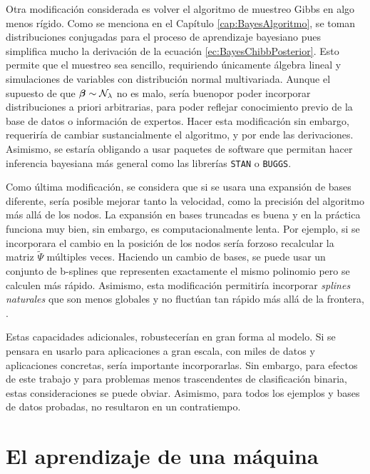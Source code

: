 \documentclass[../Main/Main.tex]{subfiles}
\begin{document}
Otra modificación considerada es volver el algoritmo de muestreo Gibbs en algo menos rígido. Como se menciona en el Capítulo \ref{cap:BayesAlgoritmo}, se toman distribuciones conjugadas para el proceso de aprendizaje bayesiano pues simplifica mucho la derivación de la ecuación \eqref{ec:BayesChibbPosterior}. Esto permite que el muestreo sea sencillo, requiriendo únicamente álgebra lineal y simulaciones de variables con distribución normal multivariada. Aunque el supuesto de que $\bm{\beta}\sim\mathcal{N}_{\lambda}$ no es malo, sería buenopor  poder incorporar distribuciones a priori arbitrarias, para poder reflejar conocimiento previo de la base de datos o información de expertos. Hacer esta modificación sin embargo, requeriría de cambiar sustancialmente el algoritmo, y por ende las derivaciones. Asimismo, se estaría obligando a usar paquetes de software que permitan hacer inferencia bayesiana más general como las librerías \verb|STAN| o \verb|BUGGS|.

Como última modificación, se considera que si se usara una expansión de bases diferente, sería posible mejorar tanto la velocidad, como la precisión del algoritmo más allá de los nodos. La expansión en bases truncadas es buena y en la práctica funciona muy bien, sin embargo, es computacionalmente lenta. Por ejemplo, si se incorporara el cambio en la posición de los nodos sería forzoso recalcular la matriz $\widetilde{\Psi}$ múltiples veces. Haciendo un cambio de bases, se puede usar un conjunto de b-splines que representen exactamente el mismo polinomio pero se calculen más rápido. Asimismo, esta modificación permitiría incorporar \textit{splines naturales} que son menos globales y no fluctúan tan rápido más allá de la frontera, \citet{wahba1990splines}. 

Estas capacidades adicionales, robustecerían en gran forma al modelo. Si se pensara en usarlo para aplicaciones a gran escala, con miles de datos y aplicaciones concretas, sería importante incorporarlas. Sin embargo, para efectos de este trabajo y para problemas menos trascendentes de clasificación binaria, estas consideraciones se puede obviar. Asimismo, para todos los ejemplos y bases de datos probadas, no resultaron en un contratiempo.

\section{El aprendizaje de una máquina}
\end{document}
